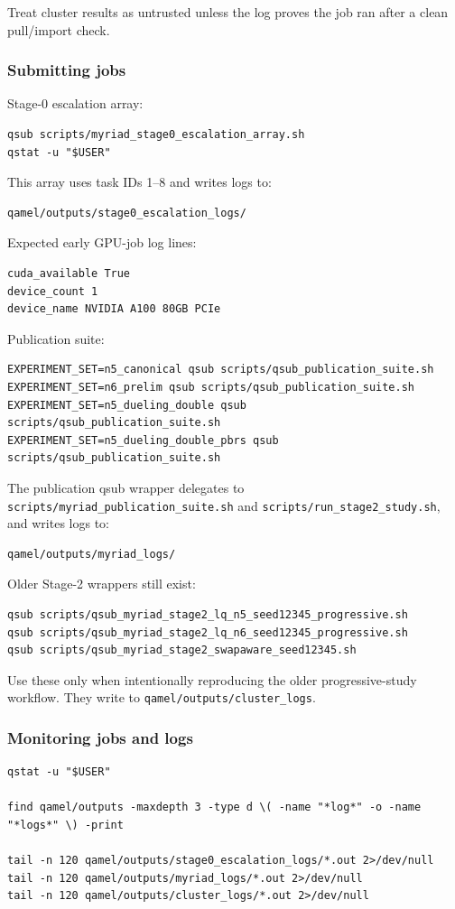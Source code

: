 \documentclass[11pt]{article}
\newcommand{\file}[1]{\texttt{\small #1}}
\begin{document}
Treat cluster results as untrusted unless the log proves the job ran after a
clean pull/import check.

\subsubsection*{Submitting jobs}
Stage-0 escalation array:
\begin{verbatim}
qsub scripts/myriad_stage0_escalation_array.sh
qstat -u "$USER"
\end{verbatim}

This array uses task IDs 1--8 and writes logs to:
\begin{verbatim}
qamel/outputs/stage0_escalation_logs/
\end{verbatim}

Expected early GPU-job log lines:
\begin{verbatim}
cuda_available True
device_count 1
device_name NVIDIA A100 80GB PCIe
\end{verbatim}

Publication suite:
\begin{verbatim}
EXPERIMENT_SET=n5_canonical qsub scripts/qsub_publication_suite.sh
EXPERIMENT_SET=n6_prelim qsub scripts/qsub_publication_suite.sh
EXPERIMENT_SET=n5_dueling_double qsub scripts/qsub_publication_suite.sh
EXPERIMENT_SET=n5_dueling_double_pbrs qsub scripts/qsub_publication_suite.sh
\end{verbatim}

The publication qsub wrapper delegates to
\file{scripts/myriad\_publication\_suite.sh} and
\file{scripts/run\_stage2\_study.sh}, and writes logs to:
\begin{verbatim}
qamel/outputs/myriad_logs/
\end{verbatim}

Older Stage-2 wrappers still exist:
\begin{verbatim}
qsub scripts/qsub_myriad_stage2_lq_n5_seed12345_progressive.sh
qsub scripts/qsub_myriad_stage2_lq_n6_seed12345_progressive.sh
qsub scripts/qsub_myriad_stage2_swapaware_seed12345.sh
\end{verbatim}
Use these only when intentionally reproducing the older progressive-study
workflow. They write to \file{qamel/outputs/cluster\_logs}.

\subsubsection*{Monitoring jobs and logs}
\begin{verbatim}
qstat -u "$USER"

find qamel/outputs -maxdepth 3 -type d \( -name "*log*" -o -name "*logs*" \) -print

tail -n 120 qamel/outputs/stage0_escalation_logs/*.out 2>/dev/null
tail -n 120 qamel/outputs/myriad_logs/*.out 2>/dev/null
tail -n 120 qamel/outputs/cluster_logs/*.out 2>/dev/null
\end{verbatim}
\end{document}
